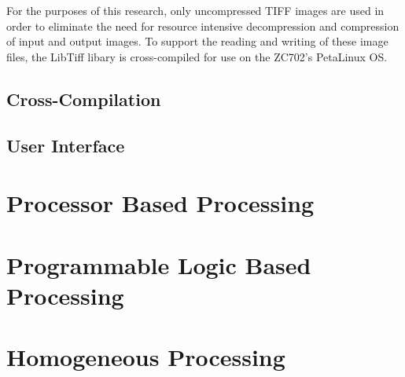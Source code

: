 For the purposes of this research, only uncompressed TIFF images are used in order to eliminate the need for resource intensive decompression and compression of input and output images.  To support the reading and writing of these image files, the LibTiff libary is cross-compiled for use on the ZC702's PetaLinux OS. 

\subsection{Cross-Compilation}

\subsection{User Interface}

\section{Processor Based Processing}

\section{Programmable Logic Based Processing}

\section{Homogeneous Processing}

